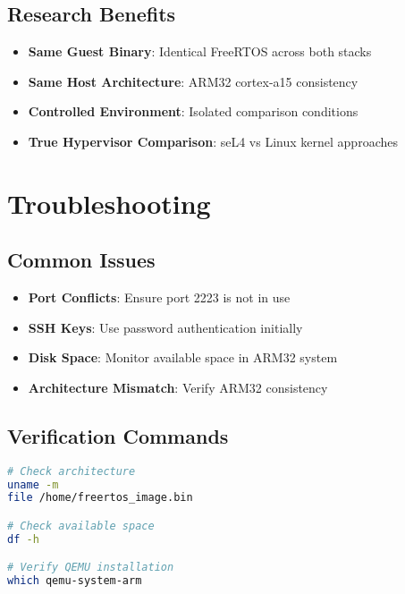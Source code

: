 \documentclass{article}
\begin{document}
\subsection{Research Benefits}
\begin{itemize}
    \item \textbf{Same Guest Binary}: Identical FreeRTOS across both stacks
    \item \textbf{Same Host Architecture}: ARM32 cortex-a15 consistency
    \item \textbf{Controlled Environment}: Isolated comparison conditions
    \item \textbf{True Hypervisor Comparison}: seL4 vs Linux kernel approaches
\end{itemize}

\section{Troubleshooting}

\subsection{Common Issues}
\begin{itemize}
    \item \textbf{Port Conflicts}: Ensure port 2223 is not in use
    \item \textbf{SSH Keys}: Use password authentication initially
    \item \textbf{Disk Space}: Monitor available space in ARM32 system
    \item \textbf{Architecture Mismatch}: Verify ARM32 consistency
\end{itemize}

\subsection{Verification Commands}
\begin{lstlisting}[language=bash]
# Check architecture
uname -m
file /home/freertos_image.bin

# Check available space
df -h

# Verify QEMU installation
which qemu-system-arm
\end{lstlisting}
\end{document}
